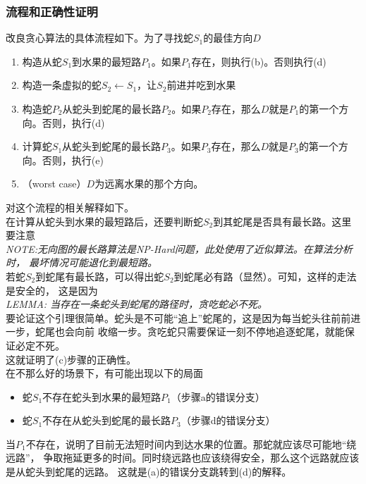 \documentclass[a4paper]{article}
\begin{document}
\subsubsection{流程和正确性证明}
改良贪心算法的具体流程如下。为了寻找蛇$S_1$的最佳方向$D$
\begin{enumerate}[label=(\alph*)]
    \item 构造从蛇$S_1$到水果的最短路$P_1$。如果$P_1$存在，则执行(b)。否则执行(d)
    \item 构造一条虚拟的蛇$S_2 \gets S_1$，让$S_2$前进并吃到水果
    \item 构造蛇$P_2$从蛇头到蛇尾的最长路$P_2$。如果$P_2$存在，那么$D$就是$P_1$的第一个方向。否则，执行(d)
    \item 计算蛇$S_1$从蛇头到蛇尾的最长路$P_3$。如果$P_3$存在，那么$D$就是$P_3$的第一个方向。否则，执行(e)
    \item （worst case）$D$为远离水果的那个方向。
\end{enumerate}
对这个流程的相关解释如下。\\

在计算从蛇头到水果的最短路后，还要判断蛇$S_2$到其蛇尾是否具有最长路。这里要注意\\

\emph{NOTE:无向图的最长路算法是NP-Hard问题，此处使用了近似算法。在算法分析时，
最坏情况可能退化到最短路。}\\

若蛇$S_2$到蛇尾有最长路，可以得出蛇$S_2$到蛇尾必有路（显然）。可知，这样的走法是安全的，
这是因为\\

\emph{LEMMA: 当存在一条蛇头到蛇尾的路径时，贪吃蛇必不死。}\\

要论证这个引理很简单。蛇头是不可能``追上''蛇尾的，这是因为每当蛇头往前前进一步，蛇尾也会向前
收缩一步。贪吃蛇只需要保证一刻不停地追逐蛇尾，就能保证必定不死。\\

这就证明了(c)步骤的正确性。\\

在不那么好的场景下，有可能出现以下的局面
\begin{itemize}
    \item 蛇$S_1$不存在蛇头到水果的最短路$P_1$（步骤a的错误分支）
    \item 蛇$S_1$不存在从蛇头到蛇尾的最长路$P_3$（步骤d的错误分支）
\end{itemize}
当$P_1$不存在，说明了目前无法短时间内到达水果的位置。那蛇就应该尽可能地``绕远路''，
争取拖延更多的时间。同时绕远路也应该绕得安全，那么这个远路就应该是从蛇头到蛇尾的远路。
这就是(a)的错误分支跳转到(d)的解释。\\
\end{document}
